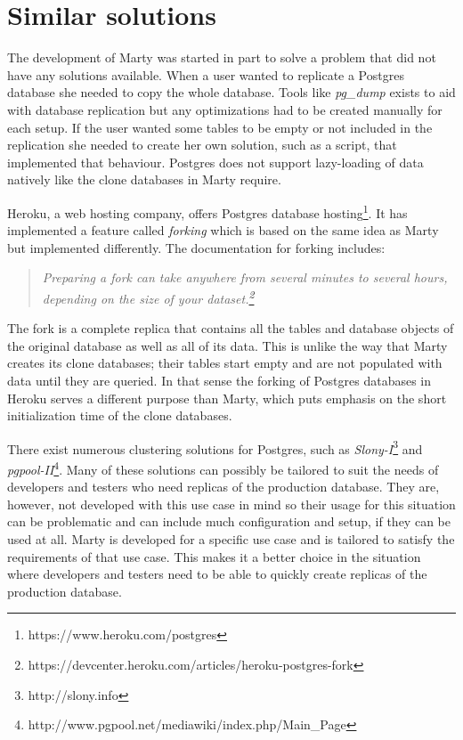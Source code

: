 \section{Similar solutions}
The development of Marty was started in part to solve a problem that did not have any solutions available.
When a user wanted to replicate a Postgres database she needed to copy the whole database.
Tools like \textit{pg\_dump} exists to aid with database replication but any optimizations had to be created manually for each setup.
If the user wanted some tables to be empty or not included in the replication she needed to create her own solution, such as a script, that implemented that behaviour.
Postgres does not support lazy-loading of data natively like the clone databases in Marty require.

Heroku, a web hosting company, offers Postgres database hosting\footnote{https://www.heroku.com/postgres}.
It has implemented a feature called \textit{forking} which is based on the same idea as Marty but implemented differently.
The documentation for forking includes:

\begin{quote}
\textit{Preparing a fork can take anywhere from several minutes to several hours, depending on the size of your dataset.\footnote{https://devcenter.heroku.com/articles/heroku-postgres-fork}}
\end{quote}

The fork is a complete replica that contains all the tables and database objects of the original database as well as all of its data.
This is unlike the way that Marty creates its clone databases; their tables start empty and are not populated with data until they are queried.
In that sense the forking of Postgres databases in Heroku serves a different purpose than Marty, which puts emphasis on the short initialization time of the clone databases.

There exist numerous clustering solutions for Postgres, such as \textit{Slony-I}\footnote{http://slony.info} and \textit{pgpool-II}\footnote{http://www.pgpool.net/mediawiki/index.php/Main\_Page}.
Many of these solutions can possibly be tailored to suit the needs of developers and testers who need replicas of the production database.
They are, however, not developed with this use case in mind so their usage for this situation can be problematic and can include much configuration and setup, if they can be used at all.
Marty is developed for a specific use case and is tailored to satisfy the requirements of that use case.
This makes it a better choice in the situation where developers and testers need to be able to quickly create replicas of the production database.

